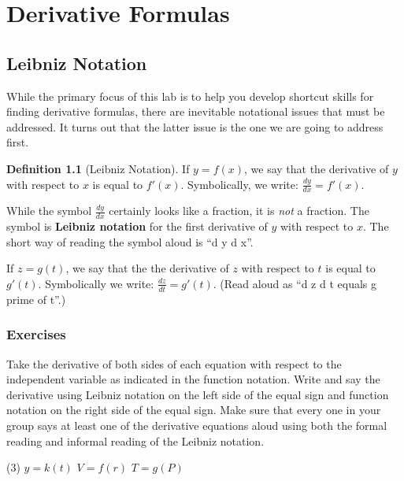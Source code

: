 \documentclass[10pt,oneside,]{book}
\newcommand{\terminology}[1]{\textbf{#1}}
\theoremstyle{plain}
\theoremstyle{definition}
\newtheorem{definition}[theorem]{Definition}
\numberwithin{equation}{section}
\newcommand{\fe}[2]{#1\mathopen{}\left(#2\right)\mathclose{}}
\newcommand{\fd}[1]{#1'}
\newcommand{\lz}[2]{\frac{d#1}{d#2}}
\begin{document}
\chapter[Derivative Formulas]{Derivative Formulas}\label{chapter-derivative-formulas}
\typeout{************************************************}
\typeout{************************************************}
\section[Leibniz Notation]{Leibniz Notation}\label{section-leibniz-notation}
While the primary focus of this lab is to help you develop shortcut skills for finding derivative formulas, there are inevitable notational issues that must be addressed.  It turns out that the latter issue is the one we are going to address first.%
\begin{definition}[Leibniz Notation]\label{definition-9}
If \(y=\fe{f}{x}\), we say that the derivative of \(y\) with respect to \(x\) is equal to \(\fe{\fd{f}}{x}\). Symbolically, we write: \(\lz{y}{x}=\fe{\fd{f}}{x}\).%
\par
While the symbol \(\lz{y}{x}\) certainly looks like a fraction, it is \emph{not} a fraction.  The symbol is \terminology{Leibniz notation} for the first derivative of \(y\) with respect to \(x\).  The short way of reading the symbol aloud is ``d y d x''.%
\par
If \(z=\fe{g}{t}\), we say that the the derivative of \(z\) with respect to \(t\) is equal to \(\fe{\fd{g}}{t}\).  Symbolically we write: \(\lz{z}{t}=\fe{\fd{g}}{t}\). (Read aloud as ``d z d t equals g prime of t''.)%
\end{definition}
\typeout{************************************************}
\typeout{************************************************}
\subsection[Exercises]{Exercises}\label{exercises-31}
\hypertarget{exercisegroup-70}{\null}Take the derivative of both sides of each equation with respect to the independent variable as indicated in the function notation.  Write and say the derivative using Leibniz notation on the left side of the equal sign and function notation on the right side of the equal sign.  Make sure that every one in your group says at least one of the derivative equations aloud using both the formal reading and informal reading of the Leibniz notation.%
\par
\begin{exercisegroup}(3)
\exercise[1.]\hypertarget{exercise-345}{\null}\(y=\fe{k}{t}\)%
\exercise[2.]\hypertarget{exercise-346}{\null}\(V=\fe{f}{r}\)%
\exercise[3.]\hypertarget{exercise-347}{\null}\(T=\fe{g}{P}\)%
\end{exercisegroup}
\par\smallskip\noindent
\typeout{************************************************}
\typeout{************************************************}
\end{document}
